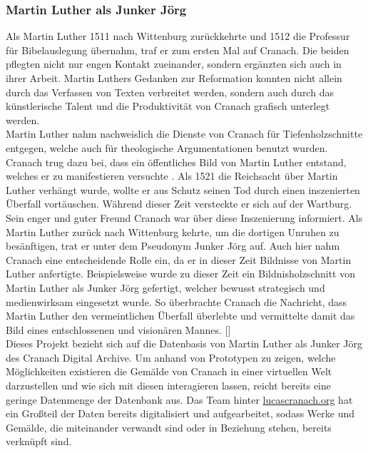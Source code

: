 \documentclass[a4paper,12pt,oneside]{article}
\begin{document}
    \subsubsection{Martin Luther als Junker Jörg}
      Als Martin Luther 1511 nach Wittenburg zurückkehrte und 1512 die Professur für
      Bibelauslegung übernahm, traf er zum ersten Mal auf Cranach.
      Die beiden pflegten nicht nur engen Kontakt zueinander, sondern ergänzten sich auch
      in ihrer Arbeit. Martin Luthers Gedanken zur Reformation konnten
      nicht allein durch das Verfassen von Texten verbreitet werden, sondern auch durch 
      das künstlerische Talent und die
      Produktivität von Cranach grafisch unterlegt werden. \\
      Martin Luther nahm nachweislich die Dienste von 
      Cranach für Tiefenholzschnitte entgegen, welche auch für
      theologische Argumentationen benutzt wurden. Cranach trug
      dazu bei, dass ein öffentliches Bild von Martin Luther entstand, welches
      er zu manifestieren versuchte . Als 1521 die Reichsacht über 
      Martin Luther verhängt wurde, 
      wollte er aus Schutz seinen Tod durch einen inszenierten Überfall vortäuschen.
      Während dieser Zeit versteckte er sich auf der Wartburg.
      Sein enger und guter Freund Cranach war über diese Inszenierung 
      informiert. 
      Als Martin Luther zurück nach Wittenburg kehrte, um die dortigen Unruhen zu besänftigen, 
      trat er unter dem Pseudonym \glqq Junker Jörg\grqq{} auf. 
      Auch hier nahm Cranach eine entscheidende Rolle ein, da er in dieser 
      Zeit Bildnisse von Martin Luther anfertigte. 
      Beispielsweise wurde zu dieser Zeit ein Bildnisholzschnitt
      von Martin Luther als Junker Jörg gefertigt, welcher bewusst strategisch und
      medienwirksam eingesetzt wurde. So überbrachte Cranach die Nachricht, dass Martin Luther
      den vermeintlichen Überfall überlebte und vermittelte damit das Bild eines 
      entschlossenen und visionären Mannes. [\cite{heydenreich2017lucas}] \\
      Dieses Projekt bezieht sich auf die Datenbasis von Martin Luther als
      Junker Jörg des Cranach Digital Archive. 
      Um anhand von Prototypen zu zeigen, welche Möglichkeiten existieren die
      Gemälde von Cranach in einer virtuellen Welt darzustellen und wie sich mit diesen
      interagieren lassen, reicht bereits eine geringe Datenmenge der Datenbank
      aus.
      Das Team hinter \url{lucascranach.org} hat ein Großteil der Daten bereits
      digitalisiert und aufgearbeitet, sodass Werke und Gemälde, die miteinander
      verwandt sind oder in Beziehung stehen, bereits verknüpft sind.
\end{document}

